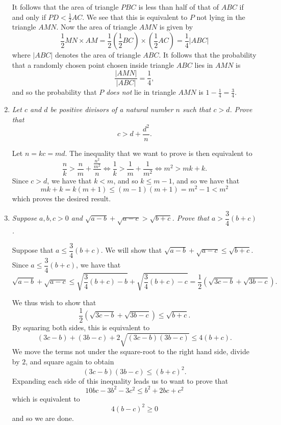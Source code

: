 \documentclass{article}
\begin{document}
\begin{enumerate}[1.]
It follows that the area of triangle $PBC$ is less than half of that of $ABC$ if and only if $PD < \frac{1}{2} AC$. We see that this is equivalent to $P$ not lying in the triangle $AMN$. Now the area of triangle $AMN$ is given by
\[
	\frac{1}{2} MN \times AM = \frac{1}{2} \left(\frac{1}{2} BC \right) \times \left(\frac{1}{2} AC\right) = \frac{1}{4} |ABC|	
\]
where $|ABC|$ denotes the area of triangle $ABC$. It follows that the probability that a randomly chosen point chosen inside triangle $ABC$ lies in $AMN$ is
\[
	\frac{|AMN|}{|ABC|} = \frac{1}{4},	
\]
and so the probability that $P$ \emph{does not} lie in triangle $AMN$ is $1 - \frac{1}{4} = \frac{3}{4}$.


\vspace{6pt}
\item %
{\itshape Let $c$ and $d$ be positive divisors of a natural number $n$ such that $c > d$. Prove that $$c > d + \frac{d^2}{n}.$$}

Let $n = kc = md$. The inequality that we want to prove is then equivalent to
\[
	\frac{n}{k} > \frac{n}{m} + \frac{\frac{n^2}{m^2}}{n} \iff \frac{1}{k} > \frac{1}{m} + \frac{1}{m^2} \iff m^2 > mk + k.
\]
Since $c > d$, we have that $k < m$, and so $k \leq m - 1$, and so we have that
\[
	mk + k = k(m + 1) \leq (m - 1)(m + 1) = m^2 - 1 < m^2
\]
which proves the desired result.


\vspace{6pt}
\item %
{\itshape Suppose $a,b,c > 0$ and $\sqrt{a-b} +\sqrt{a-c} > \sqrt{b+c}$. Prove that $a > \dfrac{3}{4} (b+c)$.}

Suppose that $a \leq \dfrac{3}{4} (b + c)$. We will show that $\sqrt{a-b} +\sqrt{a-c} \leq \sqrt{b+c}$. Since $a \leq \dfrac{3}{4} (b + c)$, we have that
\[
	\sqrt{a-b} +\sqrt{a-c} \leq \sqrt{\frac{3}{4}(b + c) - b} + \sqrt{\frac{3}{4}(b + c) - c} = \frac{1}{2} \left(\sqrt{3c - b} + \sqrt{3b - c}\right).
\]

We thus wish to show that
\[
	\dfrac{1}{2} \left(\sqrt{3c - b} + \sqrt{3b - c}\right)  \leq \sqrt{b + c}.
\]
By squaring both sides, this is equivalent to
\[
	(3c - b) + (3b - c) + 2\sqrt{(3c - b)(3b - c)}  \leq 4(b + c).
\]
We move the terms not under the square-root to the right hand side, divide by $2$, and square again to obtain
\[
	(3c - b)(3b - c) \leq (b + c)^2.
\]
Expanding each side of this inequality leads us to want to prove that
\[
	10bc - 3b^2 - 3c^2 \leq b^2 + 2bc + c^2
\]
which is equivalent to
\[
	4(b - c)^2 \geq 0
\]
and so we are done.


\end{enumerate}
\end{document}
